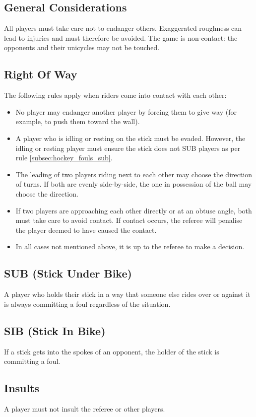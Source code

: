 \subsection{General Considerations}
All players must take care not to endanger others.
Exaggerated roughness can lead to injuries and must therefore be avoided.
The game is non-contact: the opponents and their unicycles may not be touched.

\subsection{Right Of Way}
The following rules apply when riders come into contact with each other:
\begin{itemize}
\item No player may endanger another player by forcing them to give way (for example, to push them toward the wall).
\item A player who is idling or resting on the stick must be evaded.
  However, the idling or resting player must ensure the stick does not SUB players as per rule \ref{subsec:hockey_fouls_sub}.
\item The leading of two players riding next to each other may choose the direction of turns.
If both are evenly side-by-side, the one in possession of the ball may choose the direction.
\item If two players are approaching each other directly or at an obtuse angle, both must take care to avoid contact.
  If contact occurs, the referee will penalise the player deemed to have caused the contact.
\item In all cases not mentioned above, it is up to the referee to make a decision.
\end{itemize}

\subsection{SUB (Stick Under Bike) \label{subsec:hockey_fouls_sub}}
A player who holds their stick in a way that someone else rides over or against it is always committing a foul regardless of the situation.

\subsection{SIB (Stick In Bike)}
If a stick gets into the spokes of an opponent, the holder of the stick is committing a foul.

\subsection{Insults}
A player must not insult the referee or other players.

